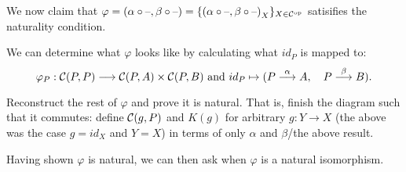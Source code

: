 \begin{center}
\end{center}

We now claim that $\varphi = (\alpha \circ \text{--}, \beta \circ \text{--}) = \{ 
{(\alpha \circ \text{--}, \beta \circ \text{--})}_X  \}_{X \in \mathcal{C}^{\mathrm{op}}}$ satisifies
the naturality condition.

\begin{center}
\end{center}

We can determine what $\varphi$ looks like by calculating what $id_P$ is mapped
to:
\[\varphi_P : \mathcal{C} (P, P) \longrightarrow \mathcal{C} (P, A) \times \mathcal{C} (P,
    B) \textrm{ and } id_P \mapsto (P \overset{\alpha}{\longrightarrow} A,\quad P \overset{\beta}{\longrightarrow} B).\]

\begin{exercise}
Reconstruct the rest of $\varphi$ and prove it is natural. That is, finish the
diagram such that it commutes: define $\mathcal{C} (g,P)$ and $K(g)$ for
arbitrary $g : Y \to X$ (the above was the case $g=id_X$ and $Y=X$) in terms of
only $\alpha$ and $\beta$/the above result.
\end{exercise}

Having shown $\varphi$ is natural, we can then ask when $\varphi$ is a natural
isomorphism.

